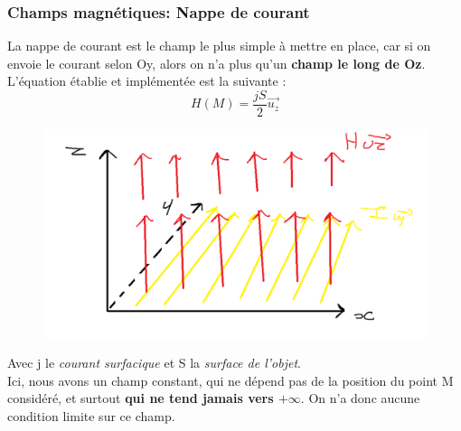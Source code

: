 \documentclass[10pt,a4paper]{article}
\begin{document}
\subsubsection{Champs magnétiques: Nappe de courant}
La nappe de courant est le champ le plus simple à mettre en place, car si on envoie le courant selon Oy, alors on n'a plus qu'un \textbf{champ le long de Oz}. L'équation établie et implémentée est la suivante \cite{site4}: 
\begin{equation}
H(M) = \frac{jS}{2}\vec{u_{z}}
\label{eq08}
\end{equation}
\begin{figure}[h]
	\centering
    \includegraphics[width=.5\linewidth]{img_yamato/Nappe.png}
    
\end{figure}
Avec j le \textit{courant surfacique} et S la \textit{surface de l'objet}. \\
Ici, nous avons un champ constant, qui ne dépend pas de la position du point M considéré, et surtout \textbf{qui ne tend jamais vers $+\infty$}. On n'a donc aucune condition limite sur ce champ.
\newpage
\end{document}

